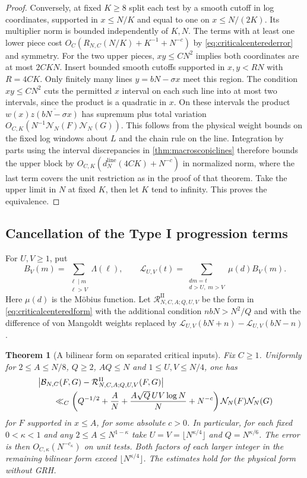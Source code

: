 \documentclass[11pt,a4paper]{article}
\numberwithin{equation}{section}
\newtheorem{theorem}{Theorem}[section]
\newcommand{\NN}{\mathcal N_N}
\begin{document}
\begin{proof}
Conversely, at fixed $K\ge8$ split each test by a smooth
cutoff in log coordinates, supported in $x\le N/K$ and
equal to one on $x\le N/(2K)$. Its multiplier norm is
bounded independently of $K,N$. The terms with at least
one lower piece cost $O_C(R_{N,C}(N/K)+K^{-1}+N^{-c})$
by \cref{eq:criticalcenterederror} and symmetry.
For the two upper pieces, $xy\le CN^2$ implies both
coordinates are at most $2CKN$. Insert bounded smooth
cutoffs supported in $x,y<RN$ with $R=4CK$.
Only finitely many lines $y=bN-\sigma x$ meet this region.
The condition $xy\le CN^2$ cuts the permitted $x$ interval
on each such line into at most two intervals, since the
product is a quadratic in $x$. On these intervals the
product $w(x)\overline{z(bN-\sigma x)}$ has supremum
plus total variation $O_{C,K}(N^{-1}\NN(F)\NN(G))$.
This follows from the physical weight bounds on the
fixed log windows about $L$ and the chain rule on the line.
Integration by parts using the interval discrepancies
in \cref{thm:macroscopiclines} therefore bounds the upper
block by $O_{C,K}(d_N^{\mathrm{line}}(4CK)+N^{-c})$ in
normalized norm, where the last term covers the unit
restriction as in the proof of that theorem.
Take the upper limit in $N$ at fixed $K$, then let $K$
tend to infinity. This proves the equivalence.
\end{proof}

\subsection{Cancellation of the Type I progression terms}

For $U,V\ge1$, put
\[
 B_V(m)=\sum_{\substack{\ell\mid m\\\ell>V}}\Lambda(\ell),
 \qquad
 \mathcal L_{U,V}(t)=\sum_{\substack{dm=t\\d>U,\;m>V}}
                             \mu(d)B_V(m).
\]
Here $\mu(d)$ is the M\"obius function. Let
$\mathcal R^{\mathrm{II}}_{N,C,A;Q,U,V}$ be the form in
\cref{eq:criticalcenteredform} with the additional condition
$nbN>N^2/Q$ and with the difference of von Mangoldt
weights replaced by
$\mathcal L_{U,V}(bN+n)-\mathcal L_{U,V}(bN-n)$.

\begin{theorem}[A bilinear form on separated critical inputs]
\label{thm:criticaltypeii}
Fix $C\ge1$. Uniformly for $2\le A\le N/8$,
$Q\ge2$, $AQ\le N$ and $1\le U,V\le N/4$, one has
\begin{align}
 &\left|\mathcal B_{N,C}(F,G)
          -\mathcal R^{\mathrm{II}}_{N,C,A;Q,U,V}(F,G)\right|
   \notag\\
 &\qquad\ll_C
   \left(Q^{-1/2}+\frac{A}{N}
                   +\frac{A\sqrt Q\,UV\log N}{N}
                   +N^{-c}\right)\NN(F)\NN(G)
   \label{eq:criticaltypeii}
\end{align}
for $F$ supported in $x\le A$, for some absolute $c>0$.
In particular, for each fixed $0<\kappa<1$ and any
$2\le A\le N^{1-\kappa}$ take
$U=V=\lfloor N^{\kappa/4}\rfloor$ and $Q=N^{\kappa/6}$.
The error is then $O_{C,\kappa}(N^{-c_\kappa})$ on
unit tests. Both factors of each larger integer in the
remaining bilinear form exceed $\lfloor N^{\kappa/4}\rfloor$.
The estimates hold for the physical form without GRH.
\end{theorem}
\end{document}

